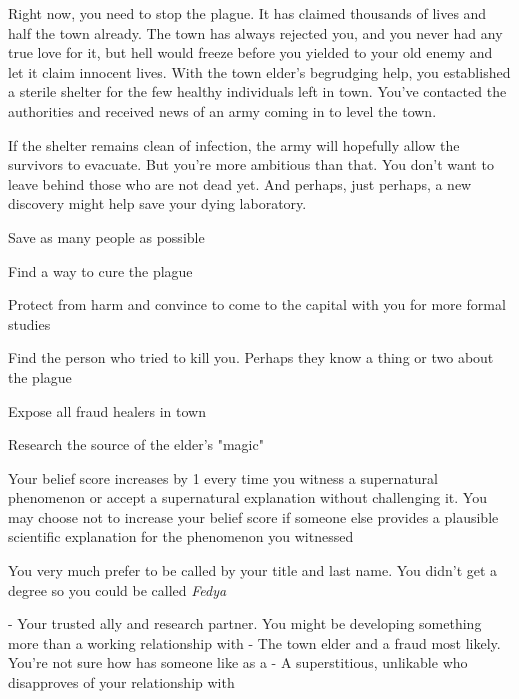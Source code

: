 \documentclass[char]{Pestilence}
\begin{document}
Right now, you need to stop the plague. It has claimed thousands of lives and half the town already. The town has always rejected you, and you never had any true love for it, but hell would freeze before you yielded to your old enemy and let it claim innocent lives. With the town elder's begrudging help, you established a sterile shelter for the few healthy individuals left in town. You've contacted the authorities and received news of an army coming in to level the town. 

If the shelter remains clean of infection, the army will hopefully allow the survivors to evacuate. But you're more ambitious than that. You don't want to leave behind those who are not dead yet. And perhaps, just perhaps, a new discovery might help save your dying laboratory.

\begin{itemz}[Goals]
	\item Save as many people as possible
	\item Find a way to cure the plague
	\item Protect \cRebel{} from harm and convince \cRebel{\them} to come to the capital with you for more formal studies 
	\item Find the person who tried to kill you. Perhaps they know a thing or two about the plague
	\item Expose all fraud healers in town
	\item Research the source of the elder's "magic"
\end{itemz}

\begin{itemz}[Notes]
	\item Your belief score increases by 1 every time you witness a supernatural phenomenon or accept a supernatural explanation without challenging it. You may choose not to increase your belief score if someone else provides a plausible scientific explanation for the phenomenon you witnessed
	\item You very much prefer to be called by your title and last name. You didn't get a degree so you could be called \textit{Fedya}
\end{itemz}

\begin{contacts}
	\contact{\cRebel{}} - Your trusted ally and research partner. You might be developing something more than a working relationship with \cRebel{\them}
	\contact{\cElder{}} - The town elder and a fraud most likely. You're not sure how \cRebel{} has someone like \cElder{\them} as a \cElder{\parent}
	\contact{\cApprentice{}} - A superstitious, unlikable \cApprentice{\human} who disapproves of your relationship with \cRebel{}
\end{contacts}
\end{document}

